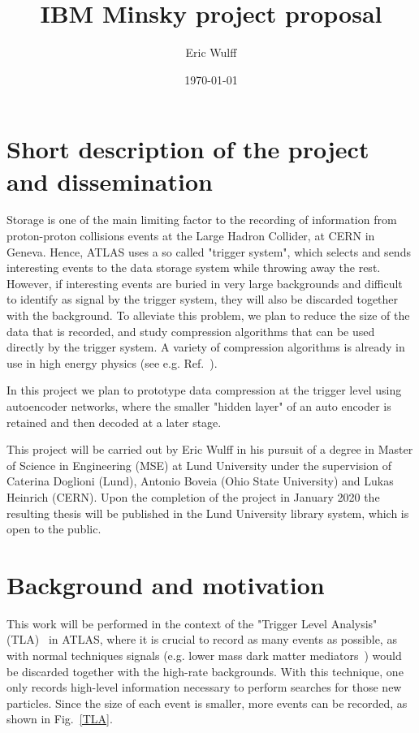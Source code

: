 \documentclass[11pt]{article}
\title{\huge IBM Minsky project proposal}
\author{Eric Wulff}
\date{\today}
\begin{document}
\maketitle

\section{Short description of the project and dissemination}

Storage is one of the main limiting factor to the recording of information from proton-proton collisions events at the Large Hadron Collider, at CERN in Geneva. Hence, ATLAS uses a so called "trigger system", which selects and sends interesting events to the data storage system while throwing away the rest. However, if interesting events are buried in very large backgrounds and difficult to identify as signal by the trigger system, they will also be discarded together with the background. To alleviate this problem, we plan to reduce the size of the data that is recorded, and study compression algorithms that can be used directly by the trigger system. A variety of compression algorithms is already in use in high energy physics (see e.g. Ref.~\cite{DBLP:journals/corr/ZhangB17}). 

In this project we plan to prototype data compression at the trigger level using autoencoder networks, where the smaller "hidden layer" of an auto encoder is retained and then decoded at a later stage. 

This project will be carried out by Eric Wulff in his pursuit of a degree in Master of Science in Engineering (MSE) at Lund University under the supervision of Caterina Doglioni (Lund), Antonio Boveia (Ohio State University) and Lukas Heinrich (CERN). Upon the completion of the project in January 2020 the resulting thesis will be published in the Lund University library system, which is open to the public. 

\section{Background and motivation}

This work will be performed in the context of the "Trigger Level Analysis" (TLA)~\cite{Aaboud:2018fzt} in ATLAS, where it is crucial to record as many events as possible, as with normal techniques signals (e.g. lower mass dark matter mediators~\cite{Chala2015}) would be discarded together with the high-rate backgrounds. With this technique, one only records high-level information necessary to perform searches for those new particles. Since the size of each event is smaller, more events can be recorded, as shown in Fig.~\ref{TLA}. 
\end{document}
